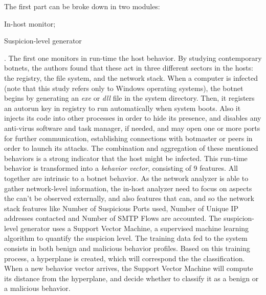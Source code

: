 \documentclass[runningheads,a4paper]{llncs}
\begin{document}
The first part can be broke down in two modules:
\begin{enumerate*}
\item In-host monitor;
\item Suspicion-level generator
\end{enumerate*}. The first one monitors in run-time the host behavior. By studying contemporary botnets, the authors found that these act in three different sectors in the hosts: the registry, the file system, and the network stack. When a computer is infected (note that this study refers only to Windows operating systems), the botnet begins by generating an \emph{exe} or \emph{dll} file in the system directory. Then, it registers an autorun key in registry to run automatically when system boots. Also it injects its code into other processes in order to hide its presence, and disables any anti-virus software and task manager, if needed, and may open one or more ports for further communication, establishing connections with botmaster or peers in order to launch its attacks. The combination and aggregation of these mentioned behaviors is a strong indicator that the host might be infected. This run-time behavior is transformed into a \textit{behavior vector}, consisting of 9 features. All together are intrinsic to a botnet behavior. As the network analyzer is able to gather network-level information, the in-host analyzer need to focus on aspects the can't be observed externally, and also features that can, and so the network stack features like Number of Suspicious Ports used, Number of Unique IP addresses contacted and Number of SMTP Flows are accounted. The suspicion-level generator uses a Support Vector Machine, a supervised machine learning algorithm to quantify the suspicion level. The training data fed to the system consists in both benign and malicious behavior profiles. Based on this training process, a hyperplane is created, which will correspond the the classification. When a new behavior vector arrives, the Support Vector Machine will compute its distance from the hyperplane, and decide whether to classify it as a benign or a malicious behavior. 
\end{document}

